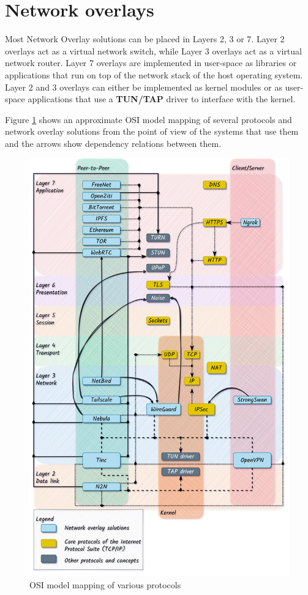 \hypertarget{thesis__020-related-work.md__network-overlays}{%
\section{Network
overlays}\label{thesis__020-related-work.md__network-overlays}}

Most Network Overlay solutions can be placed in Layers 2, 3 or 7. Layer
2 overlays act as a virtual network switch, while Layer 3 overlays act
as a virtual network router. Layer 7 overlays are implemented in
user-space as libraries or applications that run on top of the network
stack of the host operating system. Layer 2 and 3 overlays can either be
implemented as kernel modules or as user-space applications that use a
\textbf{TUN/TAP} driver to interface with the kernel.

Figure \ref{osi-map-overlays} shows an approximate OSI model mapping of
several protocols and network overlay solutions from the point of view
of the systems that use them and the arrows show dependency relations
between them.

\begin{figure}
\centering
\includegraphics[width=\textwidth,height=0.9\textheight]{thesis/../figures/osi-map-overlays.drawio.png}
\caption{OSI model mapping of various protocols
\label{osi-map-overlays}}
\end{figure}

